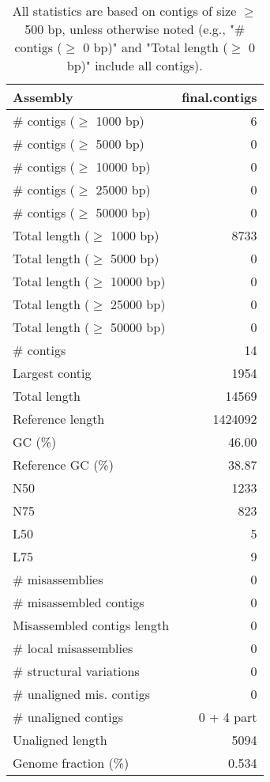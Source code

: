 \documentclass[12pt,a4paper]{article}
\begin{document}
\begin{table}[ht]
\begin{center}
\caption{All statistics are based on contigs of size $\geq$ 500 bp, unless otherwise noted (e.g., "\# contigs ($\geq$ 0 bp)" and "Total length ($\geq$ 0 bp)" include all contigs).}
\begin{tabular}{|l*{1}{|r}|}
\hline
Assembly & final.contigs \\ \hline
\# contigs ($\geq$ 1000 bp) & 6 \\ \hline
\# contigs ($\geq$ 5000 bp) & 0 \\ \hline
\# contigs ($\geq$ 10000 bp) & 0 \\ \hline
\# contigs ($\geq$ 25000 bp) & 0 \\ \hline
\# contigs ($\geq$ 50000 bp) & 0 \\ \hline
Total length ($\geq$ 1000 bp) & 8733 \\ \hline
Total length ($\geq$ 5000 bp) & 0 \\ \hline
Total length ($\geq$ 10000 bp) & 0 \\ \hline
Total length ($\geq$ 25000 bp) & 0 \\ \hline
Total length ($\geq$ 50000 bp) & 0 \\ \hline
\# contigs & 14 \\ \hline
Largest contig & 1954 \\ \hline
Total length & 14569 \\ \hline
Reference length & 1424092 \\ \hline
GC (\%) & 46.00 \\ \hline
Reference GC (\%) & 38.87 \\ \hline
N50 & 1233 \\ \hline
N75 & 823 \\ \hline
L50 & 5 \\ \hline
L75 & 9 \\ \hline
\# misassemblies & 0 \\ \hline
\# misassembled contigs & 0 \\ \hline
Misassembled contigs length & 0 \\ \hline
\# local misassemblies & 0 \\ \hline
\# structural variations & 0 \\ \hline
\# unaligned mis. contigs & 0 \\ \hline
\# unaligned contigs & 0 + 4 part \\ \hline
Unaligned length & 5094 \\ \hline
Genome fraction (\%) & 0.534 \\ \hline

\end{tabular}
\end{center}
\end{table}
\end{document}
